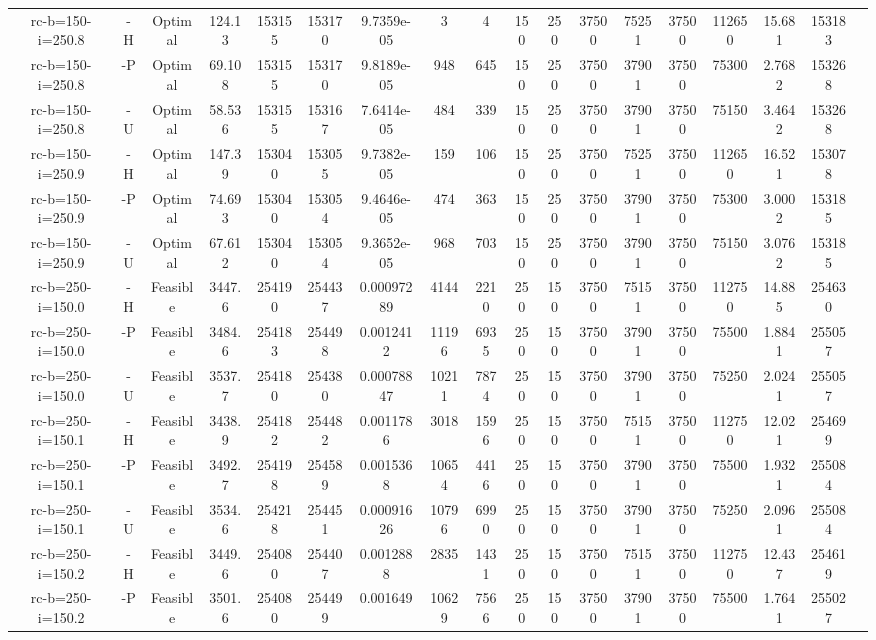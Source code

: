 \documentclass[landscape, a4paper]{article}
\begin{document}
\begin{center}
\begin{tabular}{@{}cccccccccccccccccc@{}}
rc-b=150-i=250.8 & -H & Optimal & 124.13 & 153155 & 153170 & 9.7359e-05 & 3 & 4 & 150 & 250 & 37500 & 75251 & 37500 & 112650 & 15.681 & 153183 & \\
rc-b=150-i=250.8 & -P & Optimal & 69.108 & 153155 & 153170 & 9.8189e-05 & 948 & 645 & 150 & 250 & 37500 & 37901 & 37500 & 75300 & 2.7682 & 153268 & \\
rc-b=150-i=250.8 & -U & Optimal & 58.536 & 153155 & 153167 & 7.6414e-05 & 484 & 339 & 150 & 250 & 37500 & 37901 & 37500 & 75150 & 3.4642 & 153268 & \\
rc-b=150-i=250.9 & -H & Optimal & 147.39 & 153040 & 153055 & 9.7382e-05 & 159 & 106 & 150 & 250 & 37500 & 75251 & 37500 & 112650 & 16.521 & 153078 & \\
rc-b=150-i=250.9 & -P & Optimal & 74.693 & 153040 & 153054 & 9.4646e-05 & 474 & 363 & 150 & 250 & 37500 & 37901 & 37500 & 75300 & 3.0002 & 153185 & \\
rc-b=150-i=250.9 & -U & Optimal & 67.612 & 153040 & 153054 & 9.3652e-05 & 968 & 703 & 150 & 250 & 37500 & 37901 & 37500 & 75150 & 3.0762 & 153185 & \\
rc-b=250-i=150.0 & -H & Feasible & 3447.6 & 254190 & 254437 & 0.00097289 & 4144 & 2210 & 250 & 150 & 37500 & 75151 & 37500 & 112750 & 14.885 & 254630 & \\
rc-b=250-i=150.0 & -P & Feasible & 3484.6 & 254183 & 254498 & 0.0012412 & 11196 & 6935 & 250 & 150 & 37500 & 37901 & 37500 & 75500 & 1.8841 & 255057 & \\
rc-b=250-i=150.0 & -U & Feasible & 3537.7 & 254180 & 254380 & 0.00078847 & 10211 & 7874 & 250 & 150 & 37500 & 37901 & 37500 & 75250 & 2.0241 & 255057 & \\
rc-b=250-i=150.1 & -H & Feasible & 3438.9 & 254182 & 254482 & 0.0011786 & 3018 & 1596 & 250 & 150 & 37500 & 75151 & 37500 & 112750 & 12.021 & 254699 & \\
rc-b=250-i=150.1 & -P & Feasible & 3492.7 & 254198 & 254589 & 0.0015368 & 10654 & 4416 & 250 & 150 & 37500 & 37901 & 37500 & 75500 & 1.9321 & 255084 & \\
rc-b=250-i=150.1 & -U & Feasible & 3534.6 & 254218 & 254451 & 0.00091626 & 10796 & 6990 & 250 & 150 & 37500 & 37901 & 37500 & 75250 & 2.0961 & 255084 & \\
rc-b=250-i=150.2 & -H & Feasible & 3449.6 & 254080 & 254407 & 0.0012888 & 2835 & 1431 & 250 & 150 & 37500 & 75151 & 37500 & 112750 & 12.437 & 254619 & \\
rc-b=250-i=150.2 & -P & Feasible & 3501.6 & 254080 & 254499 & 0.001649 & 10629 & 7566 & 250 & 150 & 37500 & 37901 & 37500 & 75500 & 1.7641 & 255027 & \\

\end{tabular}
\end{center}
\end{document}
